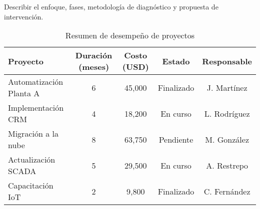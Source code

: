 Describir el enfoque, fases, metodología de diagnóstico y propuesta de intervención.

\begin{table}[H]
\begin{tabular}{|l|c|c|c|c|}
\hline
\textbf{Proyecto} & \textbf{Duración (meses)} & \textbf{Costo (USD)} & \textbf{Estado} & \textbf{Responsable} \\
\hline
Automatización Planta A & 6 & 45,000 & Finalizado & J. Martínez \\
Implementación CRM & 4 & 18,200 & En curso & L. Rodríguez \\
Migración a la nube & 8 & 63,750 & Pendiente & M. González \\
Actualización SCADA & 5 & 29,500 & En curso & A. Restrepo \\
Capacitación IoT & 2 & 9,800 & Finalizado & C. Fernández \\
\hline
\end{tabular}
\centering
\caption{Resumen de desempeño de proyectos}
\label{tab:resumen_proyectos}
\end{table}